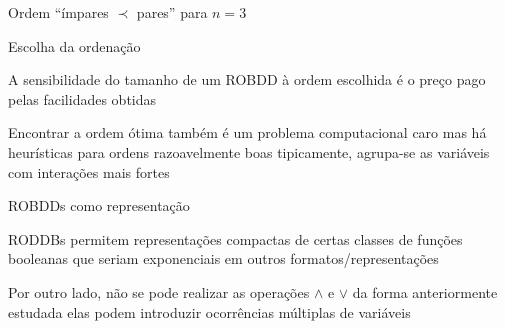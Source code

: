 \expandafter\documentclass\expandafter[table, usenames, svgnames, dvipsnames,14pt, \classopts]{beamer}
\begin{document}
\begin{frame}{Ordem ``ímpares $\prec$ pares'' para $n=3$}
\begin{figure}

    \end{figure}

\end{frame}

\begin{frame}{Escolha da ordenação}

    \begin{outline}
        \1 A sensibilidade do tamanho de um ROBDD à ordem escolhida é o preço pago pelas facilidades obtidas
        
        \vspace{1em}
        
        \1 Encontrar a ordem ótima também é um problema computacional caro
            \2[-] mas há heurísticas para ordens razoavelmente boas
            \2[-] tipicamente, agrupa-se as variáveis com interações mais fortes
            
    \end{outline}

\end{frame}

\begin{frame}{ROBDDs como representação}

    \begin{outline}
        \1 RODDBs permitem representações compactas de certas classes de funções booleanas
            \2[-] que seriam exponenciais em outros formatos/representações
            
        \vspace{1em}
        
        \1 Por outro lado, não se pode realizar as operações $\land$ e $\lor$ da forma anteriormente estudada
            \2[-] elas podem introduzir ocorrências múltiplas de variáveis
    \end{outline}

\end{frame}
\end{document}

